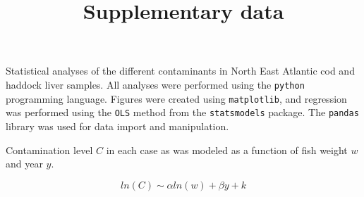 \documentclass[11pt,a4paper]{article}
\title{Supplementary data}
\author{}
\date{}
\begin{document}
\maketitle

Statistical analyses of the different contaminants in North East
Atlantic cod and haddock liver samples.  All analyses were performed
using the \texttt{python} programming language.  Figures were created
using \texttt{matplotlib}, and regression was performed using the
\texttt{OLS} method from the \texttt{statsmodels} package.  The
\texttt{pandas} library was used for data import and manipulation.

Contamination level $C$ in each case as was modeled as a function of
fish weight $w$ and year $y$.

\begin{equation*}
ln(C) \sim \alpha ln(w) + \beta y + k
\end{equation*}
\end{document}
